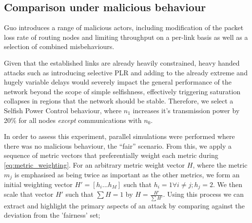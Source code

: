 \documentclass[runningheads,a4paper]{llncs}
\begin{document}
\subsection{Comparison under malicious behaviour}

Guo introduces a range of malicious actors, including modification of the packet loss rate of routing nodes and limiting throughput on a per-link basis as well as a selection of combined misbehaviours. 

Given that the established links are already heavily constrained, heavy handed attacks such as introducing selective PLR and adding to the already extreme and hugely variable delays would severely impact the general performance of the network beyond the scope of simple selfishness, effectively triggering saturation collapses in regions that the network should be stable.
Therefore, we select a Selfish Power Control behaviour, where $n_1$ increases it's transmission power by 20\% for all nodes \emph{except} communications with $n_0$.

In order to assess this experiment, parallel simulations were performed where there was no malicious behaviour, the ``fair'' scenario. 
From this, we apply a sequence of metric vectors that preferentially weight each metric during \eqref{eq:metric_weighting}.
For an arbitrary metric weight vector $H$, where the metric $m_j$ is emphasised as being twice as important as the other metrics, we form an initial weighting vector $H'=[h_i...h_M]$ such that $h_i = 1 \forall i \ne j; h_j=2$. We then scale that vector $H'$ such that $\sum H = 1$ by $H= \frac{H'}{\sum H'}$.
Using this process we can extract and highlight the primary aspects of an attack by comparing against the deviation from the 'fairness' set; 
\end{document}

